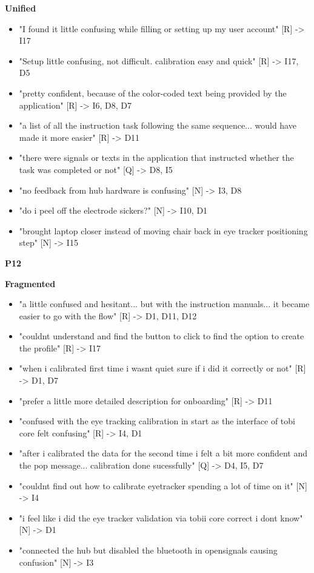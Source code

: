 \documentclass[
]{article}
\begin{document}
\textbf{Unified}

\begin{itemize}
\item
  "I found it little confusing while filling or setting up my user account" {[}R{]} -\textgreater{} I17
\item
  "Setup little confusing, not difficult. calibration easy and quick" {[}R{]} -\textgreater{} I17, D5
\item
  "pretty confident, because of the color-coded text being provided by the application" {[}R{]} -\textgreater{} I6, D8, D7
\item
  "a list of all the instruction task following the same sequence... would have made it more easier" {[}R{]} -\textgreater{} D11
\item
  "there were signals or texts in the application that instructed whether the task was completed or not" {[}Q{]} -\textgreater{} D8, I5
\item
  "no feedback from hub hardware is confusing" {[}N{]} -\textgreater{} I3, D8
\item
  "do i peel off the electrode sickers?" {[}N{]} -\textgreater{} I10, D1
\item
  "brought laptop closer instead of moving chair back in eye tracker positioning step" {[}N{]} -\textgreater{} I15
\end{itemize}

\textbf{P12}

\textbf{Fragmented}

\begin{itemize}
\item
  "a little confused and hesitant... but with the instruction manuals... it became easier to go with the flow" {[}R{]} -\textgreater{} D1, D11, D12
\item
  "couldn\textquotesingle t understand and find the button to click to find the option to create the profile" {[}R{]} -\textgreater{} I17
\item
  "when i calibrated first time i wasnt quiet sure if i did it correctly or not" {[}R{]} -\textgreater{} D1, D7
\item
  "prefer a little more detailed description for onboarding" {[}R{]} -\textgreater{} D11
\item
  "confused with the eye tracking calibration in start as the interface of tobi core felt confusing" {[}R{]} -\textgreater{} I4, D1
\item
  "after i calibrated the data for the second time i felt a bit more confident and the pop message... calibration done sucessfully" {[}Q{]} -\textgreater{} D4, I5, D7
\item
  "couldn\textquotesingle t find out how to calibrate eyetracker spending a lot of time on it" {[}N{]} -\textgreater{} I4
\item
  "i feel like i did the eye tracker validation via tobii core correct i dont know" {[}N{]} -\textgreater{} D1
\item
  "connected the hub but disabled the bluetooth in opensignals causing confusion" {[}N{]} -\textgreater{} I3
\end{itemize}
\end{document}
